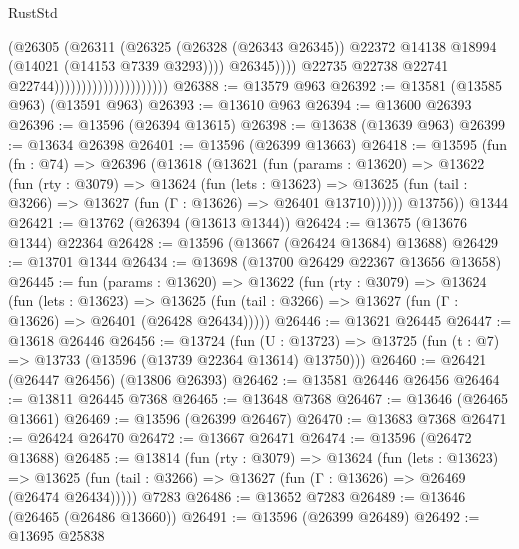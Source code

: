 \begin{lexlean}{RustStd}
\begin{coremodule}
                                                    (@26305
                                                      (@26311
                                                        (@26325
                                                          (@26328 (@26343 @26345))
                                                          @22372
                                                          @14138
                                                          @18994
                                                          (@14021 (@14153 @7339 @3293))))
                                                      @26345))))
                                              @22735
                                              @22738
                                              @22741
                                              @22744)))))))))))))))))))))
@26388 := @13579 @963
@26392 := @13581 (@13585 @963) (@13591 @963)
@26393 := @13610 @963
@26394 := @13600 @26393
@26396 := @13596 (@26394 @13615)
@26398 := @13638 (@13639 @963)
@26399 := @13634 @26398
@26401 := @13596 (@26399 @13663)
@26418 := @13595
    (fun (fn : @74) =>
    @26396
      (@13618
        (@13621
          (fun (params : @13620) =>
          @13622
            (fun (rty : @3079) =>
            @13624
              (fun (lets : @13623) =>
              @13625 (fun (tail : @3266) => @13627 (fun (Γ : @13626) => @26401 @13710))))))
        @13756))
    @1344
@26421 := @13762 (@26394 (@13613 @1344))
@26424 := @13675 (@13676 @1344) @22364
@26428 := @13596 (@13667 (@26424 @13684) @13688)
@26429 := @13701 @1344
@26434 := @13698 (@13700 @26429 @22367 @13656 @13658)
@26445 := fun (params : @13620) =>
  @13622
    (fun (rty : @3079) =>
    @13624
      (fun (lets : @13623) =>
      @13625 (fun (tail : @3266) => @13627 (fun (Γ : @13626) => @26401 (@26428 @26434)))))
@26446 := @13621 @26445
@26447 := @13618 @26446
@26456 := @13724
    (fun (U : @13723) => @13725 (fun (t : @7) => @13733 (@13596 (@13739 @22364 @13614) @13750)))
@26460 := @26421 (@26447 @26456) (@13806 @26393)
@26462 := @13581 @26446 @26456
@26464 := @13811 @26445 @7368
@26465 := @13648 @7368
@26467 := @13646 (@26465 @13661)
@26469 := @13596 (@26399 @26467)
@26470 := @13683 @7368
@26471 := @26424 @26470
@26472 := @13667 @26471
@26474 := @13596 (@26472 @13688)
@26485 := @13814
    (fun (rty : @3079) =>
    @13624
      (fun (lets : @13623) =>
      @13625 (fun (tail : @3266) => @13627 (fun (Γ : @13626) => @26469 (@26474 @26434)))))
    @7283
@26486 := @13652 @7283
@26489 := @13646 (@26465 (@26486 @13660))
@26491 := @13596 (@26399 @26489)
@26492 := @13695 @25838

\end{coremodule}
\end{lexlean}
